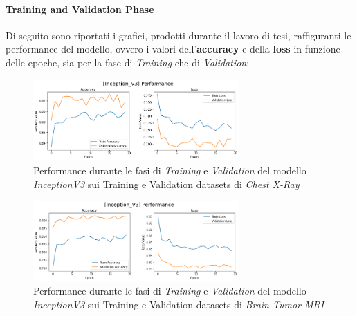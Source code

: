         \paragraph{Training and Validation Phase} 
        Di seguito sono riportati i grafici, prodotti durante il lavoro di tesi, raffiguranti le performance del modello, ovvero i valori dell'\textbf{accuracy} e della \textbf{loss} in funzione delle epoche, sia per la fase di \textit{Training} che di \textit{Validation}:
            \begin{figure}[!h]
                \centering
                \includegraphics[width=0.7\textwidth]{Images/Modelli/InceptionV3/InceptionV3 Pneumonia Performance.png}
                \caption{Performance durante le fasi di \textit{Training} e \textit{Validation} del modello \textit{InceptionV3} sui Training e Validation datasets di \textit{Chest X-Ray}}
                \label{InceptionV3 Pneumonia Performance}
            \end{figure}
            
            \begin{figure}[!h]
                \centering
                \includegraphics [width=0.7\textwidth]{Images/Modelli/InceptionV3/InceptionV3 Brain Performance.png}
                \caption{Performance durante le fasi di \textit{Training} e \textit{Validation} del modello \textit{InceptionV3} sui Training e Validation datasets di \textit{Brain Tumor MRI}}
                \label{InceptionV3 Brain Performance}
            \end{figure}
        
